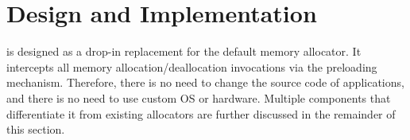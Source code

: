 \section{Design and Implementation}
\label{sec:implement}

\NM{} is designed as a drop-in replacement for the default memory allocator. It intercepts all memory allocation/deallocation invocations via the preloading mechanism. Therefore, there is no need to change the source code of applications, and there is no need to use custom OS or hardware. Multiple components that differentiate it from existing allocators are further discussed in the remainder of this section.

 
  

